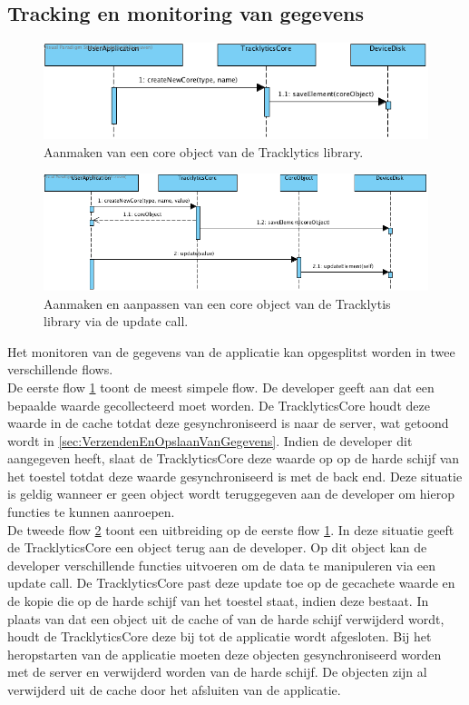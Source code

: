 \subsection{Tracking en monitoring van gegevens}\label{sec:TrackingEnMonitoringVanGegevens}
\begin{figure}[!h]
  \centering
  \includegraphics[scale=0.4]{Afbeeldingen/Architectuur/FlowDiagram1}
  \caption{Aanmaken van een core object van de Tracklytics library.}
  \label{fig:flow1}
\end{figure}
\begin{figure}[!h]
  \centering
  \includegraphics[scale=0.4]{Afbeeldingen/Architectuur/FlowDiagram2}
  \caption{Aanmaken en aanpassen van een core object van de Tracklytis library via de update call.}
  \label{fig:flow2}
\end{figure}

Het monitoren van de gegevens van de applicatie kan opgesplitst worden in twee verschillende flows. \\

De eerste flow \ref{fig:flow1} toont de meest simpele flow. De developer geeft aan dat een bepaalde waarde gecollecteerd moet worden. De TracklyticsCore houdt deze waarde in de cache totdat deze gesynchroniseerd is naar de server, wat getoond wordt in \ref{sec:VerzendenEnOpslaanVanGegevens}. Indien de developer dit aangegeven heeft, slaat de TracklyticsCore deze waarde op op de harde schijf van het toestel totdat deze waarde gesynchroniseerd is met de back end. Deze situatie is geldig wanneer er geen object wordt teruggegeven aan de developer om hierop functies te kunnen aanroepen. \\

De tweede flow \ref{fig:flow2} toont een uitbreiding op de eerste flow \ref{fig:flow1}. In deze situatie geeft de TracklyticsCore een object terug aan de developer. Op dit object kan de developer verschillende functies uitvoeren om de data te manipuleren via een update call. De TracklyticsCore past deze update toe op de gecachete waarde en de kopie die op de harde schijf van het toestel staat, indien deze bestaat. In plaats van dat een object uit de cache of van de harde schijf verwijderd wordt, houdt de TracklyticsCore deze bij tot de applicatie wordt afgesloten. Bij het heropstarten van de applicatie moeten deze objecten gesynchroniseerd worden met de server en verwijderd worden van de harde schijf. De objecten zijn al verwijderd uit de cache door het afsluiten van de applicatie.


